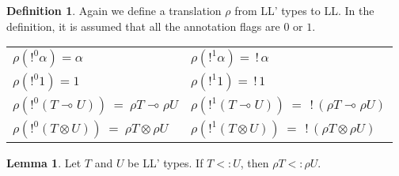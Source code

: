 \documentclass[10pt]{article}
\theoremstyle{plain}
\theoremstyle{definition}
\newtheorem{defn}{Definition}[subsection] %
\newtheorem{lemma}{Lemma}[section]
\def\bang{\,!\,}
\begin{document}
\begin{defn} Again we define a translation $\rho$ from LL' types to LL.
	In the definition, it is assumed that all the annotation flags are $0$ or $1$.
  \begin{center}
	\begin{tabular}{ll}
		$\rho (!^0 \alpha) = \alpha $ & $\rho (!^1 \alpha) = \bang \alpha$ \\
		$\rho (!^0 1) = 1 $ & $\rho (!^1 1) = \bang 1$ \\
		$\rho (!^0 (T \multimap U)) ~=~ \rho T \multimap \rho U$ & $\rho (!^1(T \multimap U)) ~=~ \bang (\rho T \multimap \rho U)$ \\
		$\rho (!^0 (T \otimes U)) ~=~ \rho T \otimes \rho U$ & $\rho (!^1(T \otimes U)) ~=~ \bang (\rho T \otimes \rho U)$ 
	\end{tabular}
	\end{center}
\end{defn}

\begin{lemma}
	\label{subLL'=>subLL}
	Let $T$ and $U$ be LL' types. If $T <: U$, then $\rho T <: \rho U$.
\end{lemma}
\end{document}
